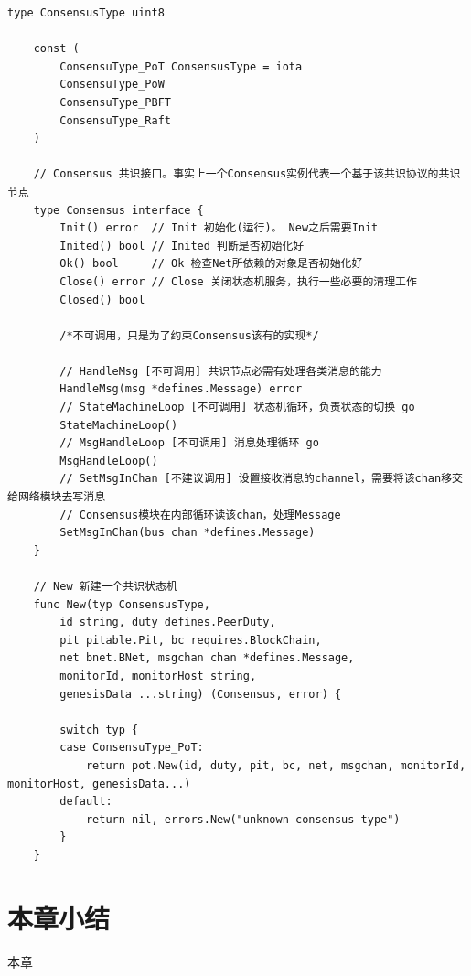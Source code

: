 \begin{lstlisting}[float,caption=modules/consensus/css.go,style=Go]
	type ConsensusType uint8

	const (
		ConsensuType_PoT ConsensusType = iota
		ConsensuType_PoW
		ConsensuType_PBFT
		ConsensuType_Raft
	)
	
	// Consensus 共识接口。事实上一个Consensus实例代表一个基于该共识协议的共识节点
	type Consensus interface {
		Init() error  // Init 初始化(运行)。 New之后需要Init
		Inited() bool // Inited 判断是否初始化好
		Ok() bool     // Ok 检查Net所依赖的对象是否初始化好
		Close() error // Close 关闭状态机服务，执行一些必要的清理工作
		Closed() bool
	
		/*不可调用，只是为了约束Consensus该有的实现*/
	
		// HandleMsg [不可调用] 共识节点必需有处理各类消息的能力
		HandleMsg(msg *defines.Message) error
		// StateMachineLoop [不可调用] 状态机循环，负责状态的切换 go
		StateMachineLoop()
		// MsgHandleLoop [不可调用] 消息处理循环 go
		MsgHandleLoop()
		// SetMsgInChan [不建议调用] 设置接收消息的channel，需要将该chan移交给网络模块去写消息
		// Consensus模块在内部循环读该chan，处理Message
		SetMsgInChan(bus chan *defines.Message)
	}
	
	// New 新建一个共识状态机
	func New(typ ConsensusType,
		id string, duty defines.PeerDuty,
		pit pitable.Pit, bc requires.BlockChain,
		net bnet.BNet, msgchan chan *defines.Message,
		monitorId, monitorHost string,
		genesisData ...string) (Consensus, error) {
	
		switch typ {
		case ConsensuType_PoT:
			return pot.New(id, duty, pit, bc, net, msgchan, monitorId, monitorHost, genesisData...)
		default:
			return nil, errors.New("unknown consensus type")
		}
	}
\end{lstlisting}

\section{本章小结}

本章
